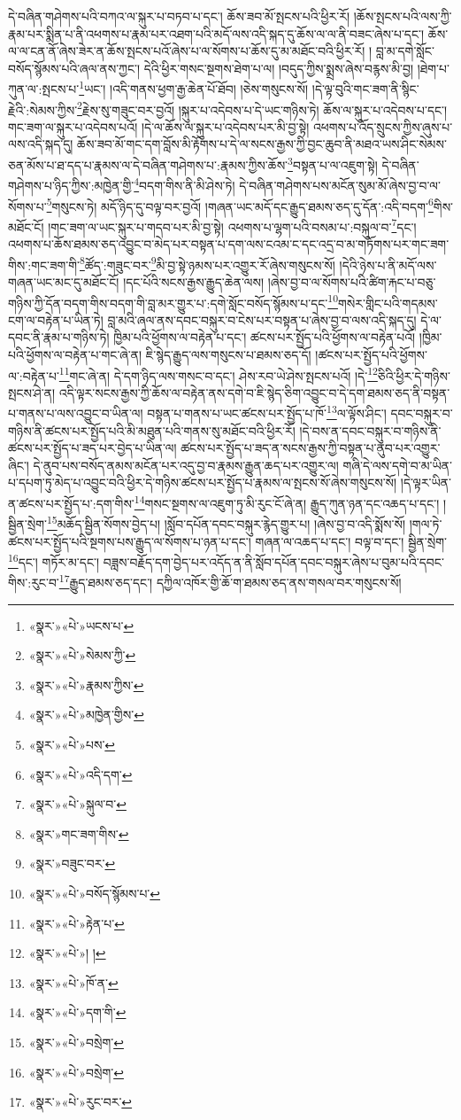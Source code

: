 དེ་བཞིན་གཤེགས་པའི་བཀའ་ལ་སྐུར་པ་བཏབ་པ་དང་། ཆོས་ཟབ་མོ་སྤངས་པའི་ཕྱིར་རོ། །ཆོས་སྤངས་པའི་ལས་ཀྱི་རྣམ་པར་སྨིན་པ་ནི་འཕགས་པ་རྣམ་པར་འཐག་པའི་མདོ་ལས་འདི་སྐད་དུ་ཆོས་ལ་ལ་ནི་བཟང་ཞེས་པ་དང་། ཆོས་ལ་ལ་ངན་ནོ་ཞེས་ཟེར་ན་ཆོས་སྤངས་པའོ་ཞེས་པ་ལ་སོགས་པ་ཆོས་དུ་མ་མཐོང་བའི་ཕྱིར་རོ། །
བླ་མ་དགེ་སློང་བསོད་སྙོམས་པའི་ཞལ་ནས་ཀྱང་། དེའི་ཕྱིར་གསང་སྔགས་ཐེག་པ་ལ། །བདུད་ཀྱིས་སྨྲས་ཞེས་བརྙས་མི་བྱ། །ཐེག་པ་ཀུན་ལ་:སྤངས་པ་\footnote{«སྣར་»«པེ་»ཡངས་པ་}ཡང་། །འདི་གནས་ཕྱག་རྒྱ་ཆེན་པོ་ཐོབ། །ཅེས་གསུངས་སོ། །དེ་ལྟ་བུའི་གང་ཟག་ནི་སྙིང་རྗེའི་:སེམས་ཀྱིས་\footnote{«སྣར་»«པེ་»སེམས་ཀྱི་}རྗེས་སུ་གཟུང་བར་བྱའོ། །སྐུར་པ་འདེབས་པ་དེ་ཡང་གཉིས་ཏེ། ཆོས་ལ་སྐུར་པ་འདེབས་པ་དང་། གང་ཟག་ལ་སྐུར་པ་འདེབས་པའོ། །དེ་ལ་ཆོས་ལ་སྐུར་པ་འདེབས་པར་མི་བྱ་སྟེ། འཕགས་པ་འོད་སྲུངས་ཀྱིས་ཞུས་པ་ལས་འདི་སྐད་དུ། ཆོས་ཟབ་མོ་གང་དག་བློས་མི་རྟོགས་པ་དེ་ལ་སངས་རྒྱས་ཀྱི་བྱང་ཆུབ་ནི་མཐའ་ཡས་ཤིང་སེམས་ཅན་མོས་པ་ཐ་དད་པ་རྣམས་ལ་དེ་བཞིན་གཤེགས་པ་:རྣམས་ཀྱིས་ཆོས་\footnote{«སྣར་»«པེ་»རྣམས་ཀྱིས་}བསྟན་པ་ལ་འཇུག་སྟེ། དེ་བཞིན་གཤེགས་པ་ཉིད་ཀྱིས་:མཁྱེན་གྱི་\footnote{«སྣར་»«པེ་»མཁྱེན་གྱིས་}བདག་གིས་ནི་མི་ཤེས་ཏེ། དེ་བཞིན་གཤེགས་པས་མངོན་སུམ་མོ་ཞེས་བྱ་བ་ལ་སོགས་པ་\footnote{«སྣར་»«པེ་»པས་}གསུངས་ཏེ། མདོ་ཉིད་དུ་བལྟ་བར་བྱའོ། །གཞན་ཡང་མདོ་དང་རྒྱུད་ཐམས་ཅད་དུ་དོན་:འདི་བདག་\footnote{«སྣར་»«པེ་»འདི་དག་}གིས་མཐོང་ངོ། །གང་ཟག་ལ་ཡང་སྐུར་པ་གདབ་པར་མི་བྱ་སྟེ། འཕགས་པ་ལྷག་པའི་བསམ་པ་:བསྐུལ་བ་\footnote{«སྣར་»«པེ་»སྐུལ་བ་}དང་། འཕགས་པ་ཆོས་ཐམས་ཅད་འབྱུང་བ་མེད་པར་བསྟན་པ་དག་ལས་ངའམ་ང་དང་འདྲ་བ་མ་གཏོགས་པར་གང་ཟག་གིས་:གང་ཟག་གི་\footnote{«སྣར་»གང་ཟག་གིས་}ཚོད་:གཟུང་བར་\footnote{«སྣར་»བཟུང་བར་}མི་བྱ་སྟེ་ཉམས་པར་འགྱུར་རོ་ཞེས་གསུངས་སོ། །དེའི་ཉེས་པ་ནི་མདོ་ལས་གཞན་ཡང་མང་དུ་མཐོང་ངོ། །དང་པོའི་སངས་རྒྱས་རྒྱུད་ཆེན་ལས། །ཞེས་བྱ་བ་ལ་སོགས་པའི་ཚིག་རྐང་པ་བཅུ་གཉིས་ཀྱི་དོན་བདག་གིས་བདག་གི་བླ་མར་གྱུར་པ་:དགེ་སློང་བསོད་སྙོམས་པ་དང་\footnote{«སྣར་»«པེ་»བསོད་སྙོམས་པ་}གསེར་གླིང་པའི་གདམས་ངག་ལ་བརྟེན་པ་ཡིན་ཏེ། བླ་མའི་ཞལ་ནས་དབང་བསྐུར་བ་ངེས་པར་བསྟན་པ་ཞེས་བྱ་བ་ལས་འདི་སྐད་དུ། དེ་ལ་དབང་ནི་རྣམ་པ་གཉིས་ཏེ། ཁྱིམ་པའི་ཕྱོགས་ལ་བརྟེན་པ་དང་། ཚངས་པར་སྤྱོད་པའི་ཕྱོགས་ལ་བརྟེན་པའོ། །ཁྱིམ་པའི་ཕྱོགས་ལ་བརྟེན་པ་གང་ཞེ་ན། ཇི་སྙེད་རྒྱུད་ལས་གསུངས་པ་ཐམས་ཅད་དོ། །ཚངས་པར་སྤྱོད་པའི་ཕྱོགས་ལ་:བརྟེན་པ་\footnote{«སྣར་»«པེ་»རྟེན་པ་}གང་ཞེ་ན། དེ་དག་ཉིད་ལས་གསང་བ་དང་། ཤེས་རབ་ཡེ་ཤེས་སྤངས་པའོ། །དེ་\footnote{«སྣར་»«པེ་»། །}ཅིའི་ཕྱིར་དེ་གཉིས་སྤངས་ཤེ་ན། འདི་ལྟར་སངས་རྒྱས་ཀྱི་ཆོས་ལ་བརྟེན་ནས་དགེ་བ་ཇི་སྙེད་ཅིག་འབྱུང་བ་དེ་དག་ཐམས་ཅད་ནི་བསྟན་པ་གནས་པ་ལས་འབྱུང་བ་ཡིན་ལ། བསྟན་པ་གནས་པ་ཡང་ཚངས་པར་སྤྱོད་པ་ཁོ་\footnote{«སྣར་»«པེ་»ཁོ་ན་}ལ་ལྟོས་ཤིང་། དབང་བསྐུར་བ་གཉིས་ནི་ཚངས་པར་སྤྱོད་པའི་མི་མཐུན་པའི་གནས་སུ་མཐོང་བའི་ཕྱིར་རོ། །དེ་བས་ན་དབང་བསྐུར་བ་གཉིས་ནི་ཚངས་པར་སྤྱོད་པ་ཟད་པར་བྱེད་པ་ཡིན་ལ། ཚངས་པར་སྤྱོད་པ་ཟད་ན་སངས་རྒྱས་ཀྱི་བསྟན་པ་ནུབ་པར་འགྱུར་ཞིང་། དེ་ནུབ་པས་བསོད་ནམས་མངོན་པར་འདུ་བྱ་བ་རྣམས་རྒྱུན་ཆད་པར་འགྱུར་ལ། གཞི་དེ་ལས་དགེ་བ་མ་ཡིན་པ་དཔག་ཏུ་མེད་པ་འབྱུང་བའི་ཕྱིར་དེ་གཉིས་ཚངས་པར་སྤྱོད་པ་རྣམས་ལ་སྤངས་སོ་ཞེས་གསུངས་སོ། །དེ་ལྟར་ཡིན་ན་ཚངས་པར་སྤྱོད་པ་:དག་གིས་\footnote{«སྣར་»«པེ་»དག་གི་}གསང་སྔགས་ལ་འཇུག་ཏུ་མི་རུང་ངོ་ཞེ་ན། རྒྱུད་ཀུན་ཉན་དང་འཆད་པ་དང་། །སྦྱིན་སྲེག་\footnote{«སྣར་»«པེ་»བསྲེག་}མཆོད་སྦྱིན་སོགས་བྱེད་པ། །སློབ་དཔོན་དབང་བསྐུར་རྙེད་གྱུར་པ། །ཞེས་བྱ་བ་འདི་སྨོས་སོ། །གལ་ཏེ་ཚངས་པར་སྤྱོད་པའི་སྔགས་པས་རྒྱུད་ལ་སོགས་པ་ཉན་པ་དང་། གཞན་ལ་འཆད་པ་དང་། བལྟ་བ་དང་། སྦྱིན་སྲེག་\footnote{«སྣར་»«པེ་»བསྲེག་}དང་། གཏོར་མ་དང་། བཟླས་བརྗོད་དག་བྱེད་པར་འདོད་ན་ནི་སློབ་དཔོན་དབང་བསྐུར་ཞེས་པ་བུམ་པའི་དབང་གིས་:རུང་བ་\footnote{«སྣར་»«པེ་»རུང་བར་}རྒྱུད་ཐམས་ཅད་དང་། དཀྱིལ་འཁོར་གྱི་ཆོ་ག་ཐམས་ཅད་ནས་གསལ་བར་གསུངས་སོ། 